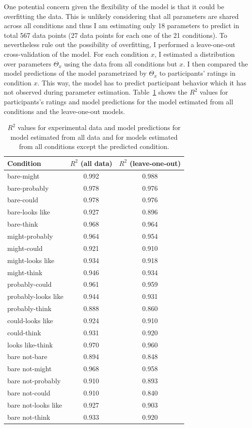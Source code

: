 One potential concern given the flexibility of the model is that it could be overfitting the data. 
This is unlikely considering that all parameters are shared across all conditions and thus I am estimating only 18 parameters to predict in total 567 data points 
(27 data points for each one of the 21 conditions). To nevertheless rule out the possibility of overfitting, I performed a leave-one-out cross-validation of
the model. For each condition $x$, I estimated a distribution over parameters $\Theta_x$ using the data from all conditions but $x$. I then
compared the model predictions of the model parametrized by $\Theta_x$ to participants' ratings in condition $x$. This way, the model has to predict
participant behavior which it has not observed during parameter estimation. Table~\ref{tbl:correlations} shows the $R^2$ values for participants's
ratings and model predictions for the model estimated from all conditions and the leave-one-out models.

\begin{table}[ht!]
\center
\begin{tabular}{l | c | c}
      Condition & $R^2$ (all data) & $R^2$ (leave-one-out) \\
      \midrule
          bare-might  &  0.992  & 0.988 \\
       bare-probably  &  0.978  & 0.976 \\
          bare-could  &  0.978  & 0.976 \\
     bare-looks like  &  0.927  & 0.896 \\
          bare-think  &  0.968  & 0.964 \\
      might-probably  &  0.964  & 0.954 \\
         might-could  &  0.921  & 0.910 \\
    might-looks like  &  0.934  & 0.918 \\
         might-think  &  0.946  & 0.934 \\
      probably-could  &  0.961  & 0.959 \\
 probably-looks like  &  0.944  & 0.931 \\
      probably-think  &  0.888  & 0.860 \\
    could-looks like  &  0.924  & 0.910 \\
         could-think  &  0.931  & 0.920 \\
    looks like-think  &  0.970  & 0.960 \\
       bare not-bare  &  0.894  & 0.848 \\
      bare not-might  &  0.968  & 0.958 \\
   bare not-probably  &  0.910  & 0.893 \\
      bare not-could  &  0.910  & 0.840 \\
 bare not-looks like  &  0.927  & 0.903 \\
      bare not-think  &  0.933  & 0.920 \\
\end{tabular}
\caption{$R^2$ values for experimental data and model predictions for model estimated from all data and for models estimated from all conditions except the predicted condition. \label{tbl:correlations}}
\end{table}


